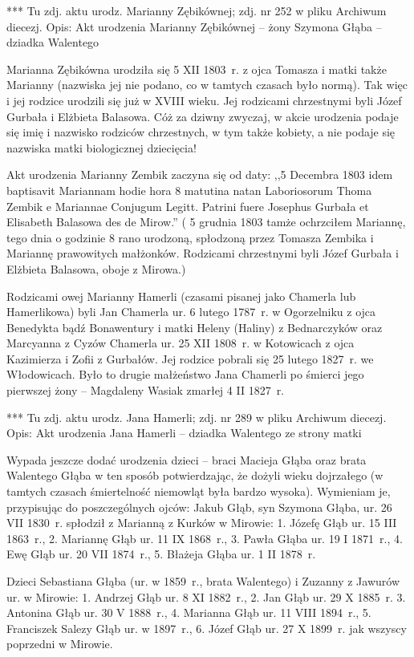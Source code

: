 {\color{red}
*** Tu zdj. aktu urodz. Marianny Zębikównej; zdj. nr 252 w pliku Archiwum diecezj.
Opis: Akt urodzenia Marianny Zębikównej -- żony Szymona Głąba -- dziadka Walentego }

Marianna Zębikówna urodziła się 5 XII 1803~r. z ojca Tomasza i matki także Marianny (nazwiska jej nie podano, co w tamtych czasach było normą). Tak więc i jej rodzice urodzili się już w XVIII wieku. Jej rodzicami chrzestnymi byli Józef Gurbała i Elżbieta Balasowa. Cóż za dziwny zwyczaj, w akcie urodzenia podaje się imię i nazwisko rodziców chrzestnych, w tym także kobiety, a nie podaje się nazwiska matki biologicznej dziecięcia!

Akt urodzenia Marianny Zembik zaczyna się od daty: ,,5 Decembra 1803 idem baptisavit Mariannam hodie hora 8 matutina natan Laboriosorum Thoma Zembik e Mariannae Conjugum Legitt. Patrini fuere Josephus Gurbała et Elisabeth Balasowa des de Mirow.'' ( 5 grudnia 1803 tamże ochrzciłem Mariannę, tego dnia o godzinie 8 rano urodzoną, spłodzoną przez Tomasza Zembika i Mariannę prawowitych małżonków. Rodzicami chrzestnymi byli Józef Gurbała i Elżbieta Balasowa, oboje z Mirowa.)

Rodzicami owej Marianny Hamerli (czasami pisanej jako Chamerla lub Hamerlikowa) byli Jan Chamerla ur. 6 lutego 1787~r. w Ogorzelniku z ojca Benedykta bądź Bonawentury i matki Heleny (Haliny) z Bednarczyków oraz Marcyanna z Cyzów Chamerla ur. 25 XII 1808~r. w Kotowicach z ojca Kazimierza i Zofii z Gurbałów. Jej rodzice pobrali się 25 lutego 1827~r. we Włodowicach. Było to drugie małżeństwo Jana Chamerli po śmierci jego pierwszej żony -- Magdaleny Wasiak zmarłej 4 II 1827~r.

{\color{red}
*** Tu zdj. aktu urodz. Jana Hamerli; zdj. nr 289 w pliku Archiwum diecezj.
Opis: Akt urodzenia Jana Hamerli -- dziadka Walentego ze strony matki }

Wypada jeszcze dodać urodzenia dzieci -- braci Macieja Głąba oraz brata Walentego Głąba w ten sposób potwierdzając, że dożyli wieku dojrzałego (w tamtych czasach śmiertelność niemowląt była bardzo wysoka). Wymieniam je, przypisując do poszczególnych ojców: Jakub Głąb, syn Szymona Głąba, ur. 26 VII 1830~r. spłodził z Marianną z Kurków w Mirowie: 1. Józefę Głąb ur. 15 III 1863~r., 2. Mariannę Głąb ur. 11 IX 1868~r., 3. Pawła Głąba ur. 19 I 1871~r., 4. Ewę Głąb ur. 20 VII 1874~r., 5. Błażeja Głąba ur. 1 II 1878~r.

Dzieci Sebastiana Głąba (ur. w 1859~r., brata Walentego) i Zuzanny z Jawurów ur. w Mirowie: 1. Andrzej Głąb ur. 8 XI 1882~r., 2. Jan Głąb ur. 29 X 1885~r. 3. Antonina Głąb ur. 30 V 1888~r., 4. Marianna Głąb ur. 11 VIII 1894~r., 5. Franciszek Salezy Głąb ur. w 1897~r., 6. Józef Głąb ur. 27 X 1899~r. jak wszyscy poprzedni w Mirowie.

